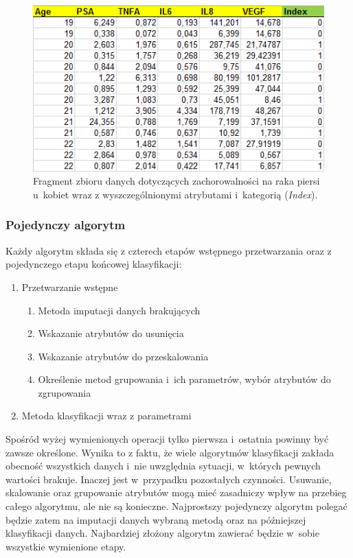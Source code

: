 \documentclass[../thesis.tex]{subfiles}
\begin{document}
\begin{figure}[h]
\centering
\includegraphics{data.png}
\caption{Fragment zbioru danych dotyczących zachorowalności na raka piersi u~kobiet wraz z wyszczególnionymi atrybutami i~kategorią (\textit{Index}).}
\label{req:data}
\end{figure}

\subsubsection{Pojedynczy algorytm}

Każdy algorytm składa się z czterech etapów wstępnego przetwarzania oraz z pojedynczego etapu końcowej klasyfikacji:
\begin{enumerate}
	\item Przetwarzanie wstępne
	\begin{enumerate}
		\item Metoda imputacji danych brakujących
		\item Wskazanie atrybutów do usunięcia
		\item Wskazanie atrybutów do przeskalowania
		\item Określenie metod grupowania i~ich parametrów, wybór atrybutów do zgrupowania
	\end{enumerate}
	\item Metoda klasyfikacji wraz z parametrami
\end{enumerate}

Spośród wyżej wymienionych operacji tylko pierwsza i~ostatnia powinny być zawsze określone. Wynika to z faktu, że wiele algorytmów klasyfikacji zakłada obecność wszystkich danych i~nie uwzględnia sytuacji, w~których pewnych wartości brakuje. Inaczej jest w~przypadku pozostałych czynności. Usuwanie, skalowanie oraz grupowanie atrybutów mogą mieć zasadniczy wpływ na przebieg całego algorytmu, ale nie są konieczne. Najprostszy pojedynczy algorytm polegać będzie zatem na imputacji danych wybraną metodą oraz na późniejszej klasyfikacji danych. Najbardziej złożony algorytm zawierać będzie w~sobie wszystkie wymienione etapy. 
\end{document}
